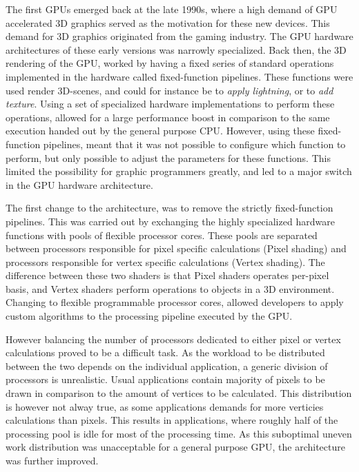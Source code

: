The first GPUs  emerged back at the late 1990s, where a high demand of GPU accelerated 3D graphics served as the motivation for these new devices.
This demand for 3D graphics originated from the gaming industry.
The GPU hardware architectures of these early versions was narrowly specialized.
Back then, the 3D rendering of the GPU, worked by having a fixed series of standard operations implemented in the hardware called fixed-function pipelines.
These functions were used render 3D-scenes, and could for instance be to \textit{apply lightning}, or to \textit{add texture}.
Using a set of specialized hardware implementations to perform these operations, allowed for a large performance boost in comparison to the same execution handed out by the general purpose CPU.
However, using these fixed-function pipelines, meant that it was not possible to configure which function to perform, but only possible to adjust the parameters for these functions.
This limited the possibility for graphic programmers greatly, and led to a major switch in the GPU hardware architecture.

The first change to the architecture, was to remove the strictly fixed-function pipelines.
This was carried out by exchanging the highly specialized hardware functions with pools of flexible processor cores.
These pools are separated between processors responsible for pixel specific calculations (Pixel shading) and processors responsible for vertex specific calculations (Vertex shading).
The difference between these two shaders is that Pixel shaders operates per-pixel basis, and Vertex shaders perform operations to objects in a 3D environment.
Changing to flexible programmable processor cores, allowed developers to apply custom algorithms to the processing pipeline executed by the GPU.

However balancing the number of processors dedicated to either pixel or vertex calculations proved to be a difficult task.
As the workload to be distributed between the two depends on the individual application, a generic division of processors is unrealistic.
Usual applications contain majority of pixels to be drawn in comparison to the amount of vertices to be calculated.
This distribution is however not alway true, as some applications demands for more verticies calculations than pixels.
This results in applications, where roughly half of the processing pool is idle for most of the processing time.
As this suboptimal uneven work distribution was unacceptable for a general purpose GPU, the architecture was further improved.

